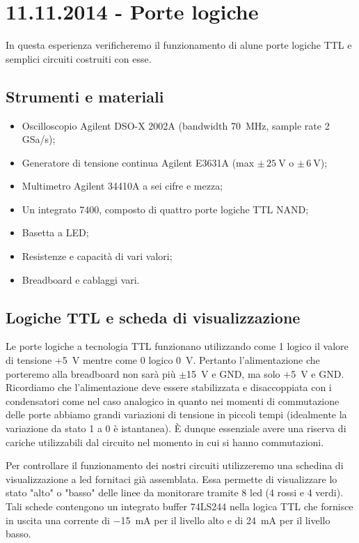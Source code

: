 \section{11.11.2014 - Porte logiche}

In questa esperienza verificheremo il funzionamento di alune porte logiche TTL e semplici circuiti costruiti con esse.

\subsection*{Strumenti e materiali}

\begin{itemize} [noitemsep]
	\item Oscilloscopio Agilent DSO-X 2002A (bandwidth \SI{70}{\mega\hertz}, sample rate \num{2} GSa/s);
	\item Generatore di tensione continua Agilent E3631A (max $\pm \, \SI{25}{\volt}$ o $\pm \, \SI{6}{\volt}$);
	\item Multimetro Agilent 34410A a sei cifre e mezza;
	\item Un integrato 7400, composto di quattro porte logiche TTL NAND; %
	\item Basetta a LED;		
	\item Resistenze e capacità di vari valori;
	\item Breadboard e cablaggi vari.
\end{itemize}

\subsection{Logiche TTL e scheda di visualizzazione}

Le porte logiche a tecnologia TTL funzionano utilizzando come 1 logico il valore di tensione +\SI{5}{\volt} mentre come 0 logico \SI{0}{\volt}.
Pertanto l'alimentazione che porteremo alla breadboard non sarà più $\pm$\SI{15}{\V} e GND, ma solo $+$\SI{5}{\V} e GND.
Ricordiamo che l'alimentazione deve essere stabilizzata e disaccoppiata con i condensatori come nel caso analogico in quanto nei momenti di commutazione delle porte abbiamo grandi variazioni di tensione in piccoli tempi (idealmente la variazione da stato 1 a 0 è istantanea).
È dunque essenziale avere una riserva di cariche utilizzabili dal circuito nel momento in cui si hanno commutazioni.

Per controllare il funzionamento dei nostri circuiti utilizzeremo una schedina di visualizzazione a led fornitaci già assemblata.
Essa permette di visualizzare lo stato "alto" o "basso" delle linee da monitorare tramite 8 led (4 rossi e 4 verdi).
Tali schede contengono un integrato buffer 74LS244 nella logica TTL che fornisce in uscita una corrente di \SI{-15}{\milli\ampere} per il livello alto e di \SI{24}{\milli\ampere} per il livello basso.

